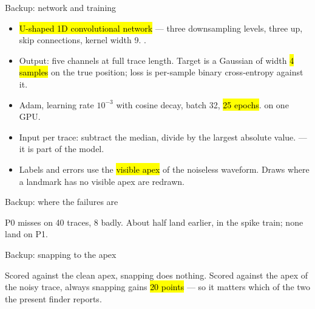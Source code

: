 \begin{frame}{Backup: network and training}
  \begin{itemize}
    \item \hl{U-shaped 1D convolutional network} --- three downsampling levels,
          three up, skip connections, kernel width 9. .
    \item Output: five channels at full trace length. Target is a Gaussian of
          width \hl{4 samples} on the true position; loss is per-sample binary
          cross-entropy against it.
    \item Adam, learning rate $10^{-3}$ with cosine decay, batch 32,
          \hl{25 epochs}.  on one GPU.
    \item Input per trace: subtract the median, divide by the largest absolute
          value.  --- it is
          part of the model.
    \item Labels and errors use the \hl{visible apex} of the noiseless
          waveform. Draws where a landmark has no visible apex are redrawn.
  \end{itemize}
\end{frame}

\begin{frame}{Backup: where the failures are}
  \par\vspace{-4pt}
  {\tiny\color{lightgrey} P0 misses on 40 traces, 8 badly. About half land earlier, in the
   spike train; none land on P1.}
\end{frame}

\begin{frame}{Backup: snapping to the apex}
  \par\vspace{-4pt}
  {\tiny\color{lightgrey} Scored against the clean apex, snapping does nothing. Scored against
   the apex of the noisy trace, always snapping gains \hl{20 points} --- so it matters which
   of the two the present finder reports.}
\end{frame}

